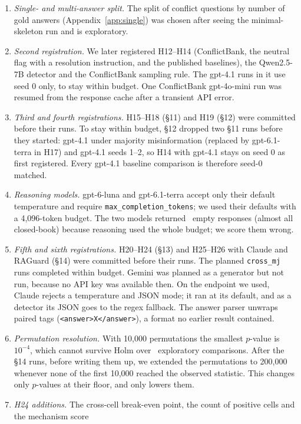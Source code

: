 \begin{enumerate}[leftmargin=*,itemsep=1pt,topsep=2pt]
\item \emph{Single- and multi-answer split.} The split of conflict questions by number of gold answers
(Appendix~\ref{app:single}) was chosen after seeing the minimal-skeleton run and is exploratory.
\item \emph{Second registration.} We later registered H12--H14 (ConflictBank, the neutral flag with a
resolution instruction, and the published baselines), the Qwen2.5-7B detector and the ConflictBank sampling rule.
The gpt-4.1 runs in it use seed 0 only, to stay within budget. One ConflictBank gpt-4o-mini run was resumed from the
response cache after a transient API error.
\item \emph{Third and fourth registrations.} H15--H18 (\S11) and H19 (\S12) were committed before their runs. To stay
within budget, \S12 dropped two \S11 runs before they started: gpt-4.1 under majority misinformation (replaced by
gpt-6.1-terra in H17) and gpt-4.1 seeds 1--2, so H14 with gpt-4.1 stays on seed 0 as first registered. Every
gpt-4.1 baseline comparison is therefore seed-0 matched.
\item \emph{Reasoning models.} gpt-6-luna and gpt-6.1-terra accept only their default temperature and require
\texttt{max\_completion\_tokens}; we used their defaults with a 4,096-token budget. The two models returned
\Nempty\ empty responses (almost all closed-book) because reasoning used the whole budget; we score them wrong.
\item \emph{Fifth and sixth registrations.} H20--H24 (\S13) and H25--H26 with Claude and RAGuard (\S14) were
committed before their runs. The planned \texttt{cross\_mj} runs completed within budget. Gemini was planned
as a generator but not run, because no API key was available then. On the endpoint we used, Claude rejects a temperature and JSON mode; it
ran at its default, and as a detector its JSON goes to the regex fallback. The answer
parser unwraps paired tags (\texttt{<answer>X</answer>}), a format no earlier result contained.
\item \emph{Permutation resolution.} With 10,000 permutations the smallest $p$-value is $10^{-4}$, which cannot
survive Holm over \nExploratory\ exploratory comparisons. After the \S14 runs, before writing them up, we
extended the permutations to 200,000 whenever none of the first 10,000 reached the observed statistic. This changes
only $p$-values at their floor, and only lowers them.
\item \emph{H24 additions.} The cross-cell break-even point, the count of positive cells and the mechanism score

\end{enumerate}
